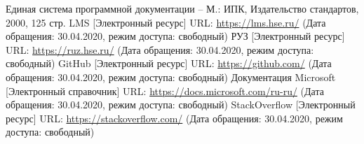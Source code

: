 \documentclass{../includes/TechDoc}
\begin{document}
    \begin{thebibliography}{3}
        Единая система программной документации – М.: ИПК, Издательство стандартов, 2000, 125 стр.
         LMS [Электронный ресурс] URL: \url{https://lms.hse.ru/} (Дата обращения: 30.04.2020, режим доступа: свободный)
         РУЗ [Электронный ресурс] URL: \url{https://ruz.hse.ru/} (Дата обращения: 30.04.2020, режим доступа: свободный)
         GitHub [Электронный ресурс] URL: \url{https://github.com/} (Дата обращения: 30.04.2020, режим доступа: свободный)
         Документация Microsoft [Электронный справочник] URL: \url{https://docs.microsoft.com/ru-ru/} (Дата обращения: 30.04.2020, режим доступа: свободный)
         StackOverflow [Электронный ресурс] URL: \url{https://stackoverflow.com/} (Дата обращения: 30.04.2020, режим доступа: свободный)
    \end{thebibliography}


    \registrationList
\end{document}

